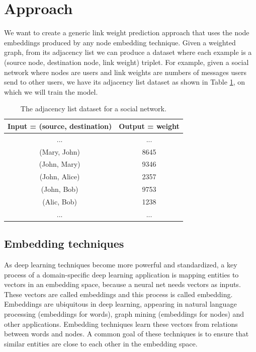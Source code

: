 \documentclass{article} %
\begin{document}
\section{Approach}
We want to create a generic link weight prediction approach that uses the node embeddings produced by any node embedding technique.
Given a weighted graph, from its adjacency list we can produce a dataset where each example is a (source node, destination node, link weight) triplet.
For example, given a social network where nodes are users and link weights are numbers of messages users send to other users, we have its adjacency list dataset as shown in Table \ref{tab:link-list-dataset}, on which we will train the model.
\begin{table}[h] \centering
	\caption{The adjacency list dataset for a social network.}
	\begin{tabular}{cc} \\ \hline
		\textbf{Input = (source, destination)} & \textbf{Output = weight} \\ \hline
		...                        & ... \\ \hline
		(Mary, John) & 8645 \\ \hline
		(John, Mary) & 9346 \\ \hline
		(John, Alice) & 2357 \\ \hline
		(John, Bob) & 9753 \\ \hline
		(Alic, Bob) & 1238 \\ \hline
		...                        & ... \\ \hline
	\end{tabular}
	\label{tab:link-list-dataset}
\end{table}

\subsection{Embedding techniques}
As deep learning techniques become more powerful and standardized,
a key process of a domain-specific deep learning application
is mapping entities to vectors in an embedding space,
because a neural net needs vectors as inputs.
These vectors are called embeddings and this process is called embedding.
Embeddings are ubiquitous in deep learning,
appearing in natural language processing (embeddings for words),
graph mining (embeddings for nodes) and other applications.
Embedding techniques learn these vectors from relations between words and nodes.
A common goal of these techniques is to ensure that
similar entities are close to each other in the embedding space.
\end{document}

